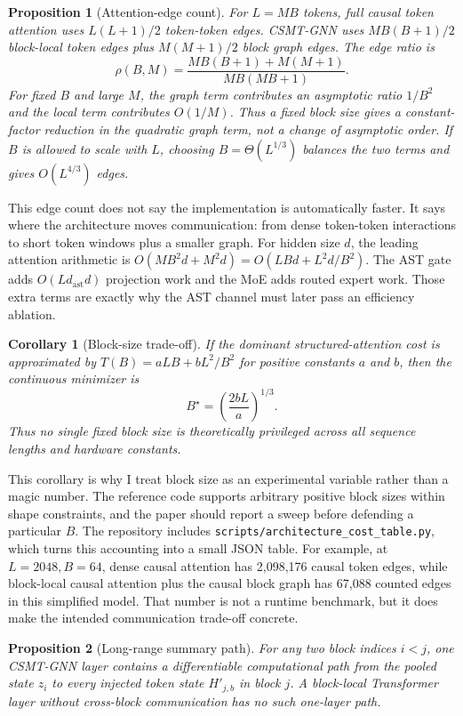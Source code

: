 \documentclass[10pt]{article}
\newtheorem{proposition}{Proposition}
\newtheorem{corollary}{Corollary}
\begin{document}
\begin{proposition}[Attention-edge count]
\label{prop:edges}
For $L=MB$ tokens, full causal token attention uses
$L(L+1)/2$ token-token edges.  CSMT-GNN uses
$M B(B+1)/2$ block-local token edges plus $M(M+1)/2$ block graph edges.  The edge
ratio is
\[
  \rho(B,M)=
  \frac{M B(B+1)+M(M+1)}{M B(MB+1)}.
\]
For fixed $B$ and large $M$, the graph term contributes an asymptotic ratio
$1/B^2$ and the local term contributes $O(1/M)$.  Thus a fixed block size gives
a constant-factor reduction in the quadratic graph term, not a change of
asymptotic order.  If $B$ is allowed to scale with $L$, choosing
$B=\Theta(L^{1/3})$ balances the two terms and gives $O(L^{4/3})$ edges.
\end{proposition}


This edge count does not say the implementation is automatically faster.  It
says where the architecture moves communication: from dense token-token
interactions to short token windows plus a smaller graph.  For hidden size
$d$, the leading attention arithmetic is
$O(MB^2d+M^2d)=O(LBd+L^2d/B^2)$.  The AST gate adds
$O(Ld_{\mathrm{ast}}d)$ projection work and the MoE adds routed expert work.
Those extra terms are exactly why the AST channel must later pass an efficiency
ablation.

\begin{corollary}[Block-size trade-off]
\label{cor:block-size}
If the dominant structured-attention cost is approximated by
$T(B)=aLB+bL^2/B^2$ for positive constants $a$ and $b$, then the continuous
minimizer is
\[
  B^\star = \left(\frac{2bL}{a}\right)^{1/3}.
\]
Thus no single fixed block size is theoretically privileged across all sequence
lengths and hardware constants.
\end{corollary}


This corollary is why I treat block size as an experimental variable rather
than a magic number.  The reference code supports arbitrary positive block sizes
within shape constraints, and the paper should report a sweep before defending a
particular $B$.
The repository includes \texttt{scripts/architecture\_cost\_table.py}, which
turns this accounting into a small JSON table.  For example, at
$L=2048,B=64$, dense causal attention has 2,098,176 causal token edges, while
block-local causal attention plus the causal block graph has 67,088 counted
edges in this simplified model.  That number is not a runtime benchmark, but it
does make the intended communication trade-off concrete.

\begin{proposition}[Long-range summary path]
\label{prop:path}
For any two block indices $i<j$, one CSMT-GNN layer contains a differentiable
computational path from the pooled state $z_i$ to every injected token state
$H'_{j,b}$ in block $j$.  A block-local Transformer layer without cross-block
communication has no such one-layer path.
\end{proposition}
\end{document}
